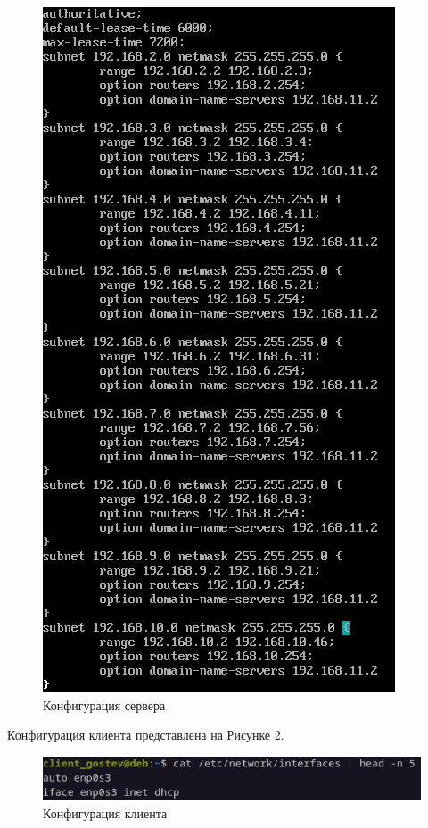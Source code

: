 \documentclass[14pt, a4paper]{extarticle}
\numberwithin{equation}{section}
\begin{document}
\begin{figure}[H]
        \centering
        \includegraphics[scale=0.9]{services/dhcp/servercfg.png}
        \caption{Конфигурация сервера}
        \label{dhcp_server_cfg}
\end{figure}

Конфигурация клиента представлена на Рисунке \ref{dhcp_client_cfg}.

\begin{figure}[H]
        \centering
        \includegraphics[scale=1.2]{services/dhcp/clientcfg.png}
        \caption{Конфигурация клиента}
        \label{dhcp_client_cfg}
\end{figure}
\end{document}
